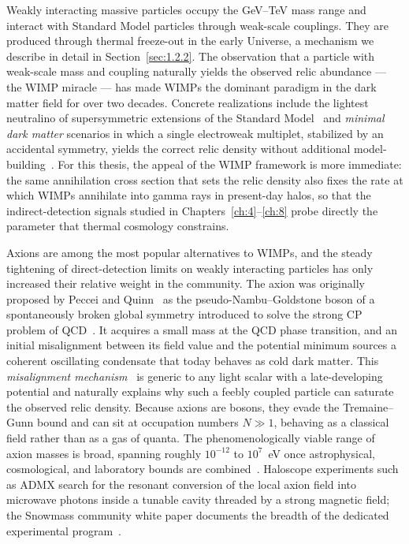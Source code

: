 Weakly interacting massive particles occupy the GeV--TeV mass range and interact with Standard Model particles through weak-scale couplings.
They are produced through thermal freeze-out in the early Universe, a mechanism we describe in detail in Section~\ref{sec:1.2.2}.
The observation that a particle with weak-scale mass and coupling naturally yields the observed relic abundance --- the WIMP miracle --- has made WIMPs the dominant paradigm in the dark matter field for over two decades.
Concrete realizations include the lightest neutralino of supersymmetric extensions of the Standard Model~\cite{Ellis:1983ew} and \emph{minimal dark matter} scenarios in which a single electroweak multiplet, stabilized by an accidental symmetry, yields the correct relic density without additional model-building~\cite{Cirelli:2005uq}.
For this thesis, the appeal of the WIMP framework is more immediate: the same annihilation cross section that sets the relic density also fixes the rate at which WIMPs annihilate into gamma rays in present-day halos, so that the indirect-detection signals studied in Chapters~\ref{ch:4}--\ref{ch:8} probe directly the parameter that thermal cosmology constrains.

Axions are among the most popular alternatives to WIMPs, and the steady tightening of direct-detection limits on weakly interacting particles has only increased their relative weight in the community.
The axion was originally proposed by Peccei and Quinn~\cite{Peccei:1977hh} as the pseudo-Nambu--Goldstone boson of a spontaneously broken global symmetry introduced to solve the strong CP problem of QCD~\cite{Weinberg:1977ma,Wilczek:1977pj}.
It acquires a small mass at the QCD phase transition, and an initial misalignment between its field value and the potential minimum sources a coherent oscillating condensate that today behaves as cold dark matter.
This \emph{misalignment mechanism}~\cite{Preskill:1982cy,Abbott:1982af,Dine:1982ah} is generic to any light scalar with a late-developing potential and naturally explains why such a feebly coupled particle can saturate the observed relic density.
Because axions are bosons, they evade the Tremaine--Gunn bound and can sit at occupation numbers $N \gg 1$, behaving as a classical field rather than as a gas of quanta.
The phenomenologically viable range of axion masses is broad, spanning roughly $10^{-12}$ to $10^{7}$~eV once astrophysical, cosmological, and laboratory bounds are combined~\cite{Adams:2022pbo}.
Haloscope experiments such as ADMX search for the resonant conversion of the local axion field into microwave photons inside a tunable cavity threaded by a strong magnetic field; the Snowmass community white paper documents the breadth of the dedicated experimental program~\cite{Adams:2022pbo}.

